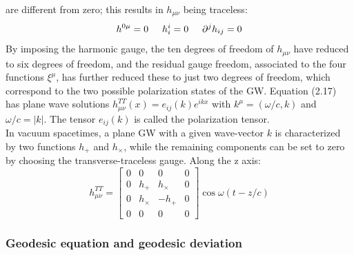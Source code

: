\documentclass[binding=0.6cm, LaM]{sapthesis}
\begin{document}
	are different from zero; this results in $h_{\mu\nu}$ being traceless:
		\begin{equation}
			h^{0\mu} = 0 \hspace*{0.5cm}  h^{i}_i = 0  \hspace*{0.5cm}   {\partial}^jh_{ij} = 0
		\end{equation}
	By imposing the harmonic gauge, the ten degrees of freedom of $h_{\mu\nu}$ 
	have reduced to six degrees of freedom, and the residual gauge freedom,
	associated to the four functions $\xi^{\mu}$, has further reduced these to just two degrees of freedom, 
	which correspond to the two possible polarization states of the GW. 
	Equation (2.17) has plane wave solutions $h_{\mu\nu}^{TT}(x)=e_{ij}(k)e^{ikx}$ with 
	$k^{\mu}=(\omega/c,k)$ and $\omega/c=|k|$. The tensor $e_{ij}(k)$ is called the polarization tensor. \\
	In vacuum spacetimes, a plane GW with a given wave-vector $k$ is characterized 
	by two functions $h_+$ and $h_{\times}$, while the remaining components can be set to zero by
	choosing the transverse-traceless gauge. 
	Along the z axis:
		\begin{equation} 
		h_{\mu\nu}^{TT} = 
		\begin{bmatrix}
		0 & 0 & 0 & 0 \\
		0 & h_{+} & h_{\times} & 0 \\
		0 & h_{\times} & -h_{+} & 0 \\
		0 & 0 & 0 & 0 
		\end{bmatrix}\cos{\omega(t-z/c)}
		\end{equation}

\subsubsection{Geodesic equation and geodesic deviation}
\end{document}
